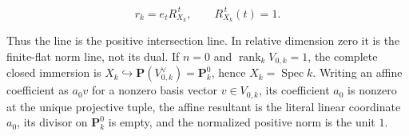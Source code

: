 \begin{theorem}
\begin{equation}
 r_k=e_tR_{X_k}^{\,t},\qquad R_{X_k}^{\,t}(t)=1.
 \label{eq:p171-revised2-positive-normalization}
\end{equation}

Thus the line is the positive intersection line.  In relative dimension
zero it is the finite-flat norm line, not its dual.  If \(n=0\) and
\(\operatorname{rank}_kV_{0,k}=1\), the complete closed immersion is
\(X_k\hookrightarrow\mathbf P(V_{0,k}^\vee)=\mathbf P^0_k\), hence
\(X_k=\operatorname{Spec}k\).  Writing an affine coefficient as
\(a_0v\) for a nonzero basis vector \(v\in V_{0,k}\), its coefficient
\(a_0\) is nonzero at the unique projective tuple, the affine resultant is
the literal linear coordinate \(a_0\), its divisor on \(\mathbf P^0_k\)
is empty, and the normalized positive norm is the unit \(1\).
\end{theorem}

